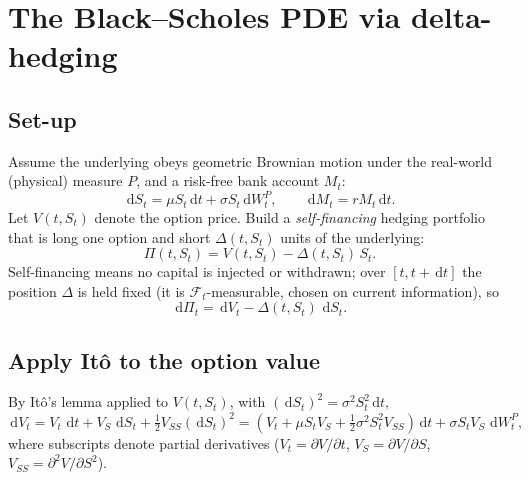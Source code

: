 \documentclass[11pt]{article}
\newcommand{\dd}{\,\mathrm{d}}
\begin{document}
\section{The Black--Scholes PDE via delta-hedging}\label{sec:pde}

\subsection{Set-up}
Assume the underlying obeys geometric Brownian motion under the real-world (physical) measure $P$,
and a risk-free bank account $M_t$:
\begin{equation}
\dd S_t = \mu S_t \dd t + \sigma S_t \dd W_t^{P},
\qquad
\dd M_t = r M_t \dd t.
\end{equation}
Let $V(t,S_t)$ denote the option price. Build a \emph{self-financing} hedging portfolio that is long
one option and short $\Delta(t,S_t)$ units of the underlying:
\begin{equation}
\Pi(t,S_t) = V(t,S_t) - \Delta(t,S_t)\,S_t.
\end{equation}
Self-financing means no capital is injected or withdrawn; over $[t,t+\dd t]$ the position $\Delta$ is
held fixed (it is $\mathcal F_t$-measurable, chosen on current information), so
\begin{equation}\label{eq:dPi}
\dd \Pi_t = \dd V_t - \Delta(t,S_t)\,\dd S_t.
\end{equation}

\subsection{Apply It\^o to the option value}
By It\^o's lemma applied to $V(t,S_t)$, with $(\dd S_t)^2 = \sigma^2 S_t^2 \dd t$,
\begin{equation}
\dd V_t = V_t\,\dd t + V_S\,\dd S_t + \tfrac12 V_{SS}(\dd S_t)^2
= \left(V_t + \mu S_t V_S + \tfrac12\sigma^2 S_t^2 V_{SS}\right)\dd t + \sigma S_t V_S\,\dd W_t^{P},
\end{equation}
where subscripts denote partial derivatives ($V_t = \partial V/\partial t$, $V_S=\partial V/\partial S$,
$V_{SS}=\partial^2 V/\partial S^2$).
\end{document}
